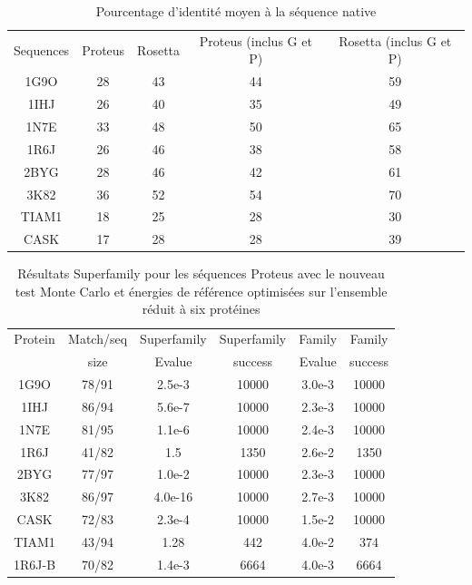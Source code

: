     \begin{table}[!htbp]
      \centering

      \begin{tabular}{ccccc}

        \toprule
        Sequences & Proteus & Rosetta & Proteus (inclus G et P) & Rosetta (inclus G et P)\\
        \cmidrule{1-5}
        1G9O  & 28 &  43 & 44 & 59 \\
        1IHJ  & 26 &  40 & 35 & 49 \\
        1N7E  & 33 &  48 & 50 & 65 \\
        1R6J  & 26 &  46 & 38 & 58 \\
        2BYG  & 28 &  46 & 42 & 61 \\
        3K82  & 36 &  52 & 54 & 70 \\
        TIAM1 & 18 &  25 & 28 & 30 \\
        CASK  & 17 &  28 & 28 &  39 \\

        \bottomrule

      \end{tabular}      
      \caption{Pourcentage d'identité moyen à la séquence native}
\label{tab:Entropie_PDZ}      
    \end{table}



\begin{table}[h]
  \raggedleft{}
  
  \begin{tabular}{cccccc}
    
    \toprule
    Protein & Match/seq & Superfamily & Superfamily & Family & Family \\
            & size      & Evalue      & success     & Evalue & success\\
    \cmidrule{1-6}
    1G9O  & 78/91 & 2.5e-3  & 10000 & 3.0e-3 & 10000 \\
    1IHJ  & 86/94 & 5.6e-7  & 10000 & 2.3e-3 & 10000 \\
    1N7E  & 81/95 & 1.1e-6  & 10000 & 2.4e-3 & 10000 \\
    1R6J  & 41/82 & 1.5     &  1350 & 2.6e-2 &  1350 \\
    2BYG  & 77/97 & 1.0e-2  & 10000 & 2.3e-3 & 10000 \\
    3K82  & 86/97 & 4.0e-16 & 10000 & 2.7e-3 & 10000 \\
    \cmidrule{1-6}
    CASK  & 72/83 & 2.3e-4  & 10000 & 1.5e-2 & 10000 \\
    TIAM1 & 43/94 & 1.28    & 442   & 4.0e-2 & 374 \\
    \cmidrule{1-6}
    1R6J-B & 70/82 & 1.4e-3    & 6664   & 4.0e-3 & 6664 \\
    \bottomrule        
  \end{tabular}   
  \caption{Résultats Superfamily pour les séquences Proteus avec le nouveau test Monte Carlo et énergies de référence optimisées sur l'ensemble réduit à six protéines}   
  \label{tab:superfamily_Old_MCtest}       
\end{table}




